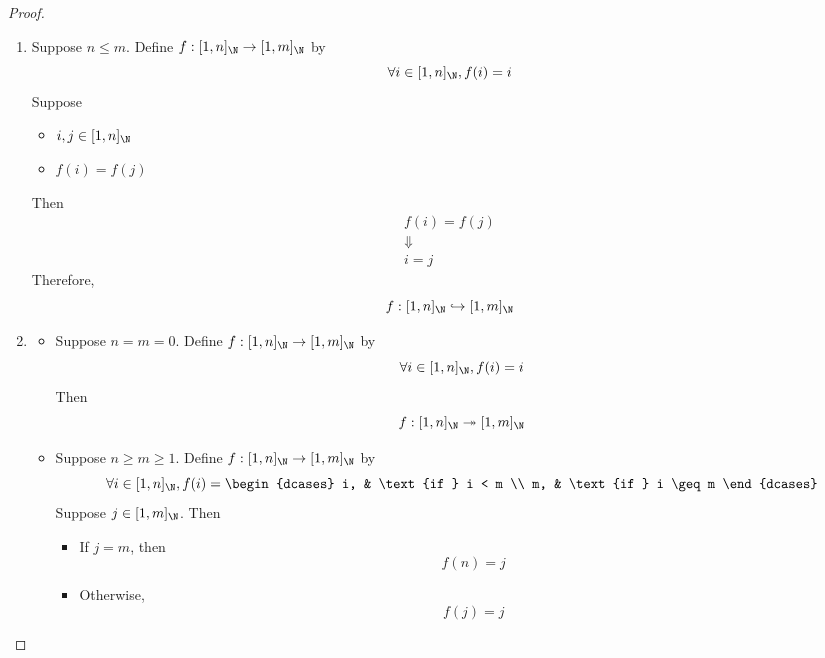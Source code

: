 \begin{proof}
  \leavevmode\par
  \begin{enumerate}[label=\textbf{(\Alph*)}]
    \item Suppose $n \leq m$. Define $f: [1, n]_{\N} \to [1, m]_{\N}$ by
          \[
            \forall i \in [1, n]_{\N}, f(i) = i
          \]
          Suppose
          \begin{itemize}
            \item $i, j \in [1, n]_{\N}$
            \item $f(i) = f(j)$
          \end{itemize}
          Then
          \[
            \begin{array}{c}
              f(i) = f(j) \\
              \Downarrow  \\
              i = j
            \end{array}
          \]
          Therefore,
          \[
            f: [1, n]_{\N} \hookrightarrow [1, m]_{\N}
          \]
    \item \begin{itemize}
            \item Suppose $n = m = 0$. Define $f: [1, n]_{\N} \to [1, m]_{\N}$ by
                  \[
                    \forall i \in [1, n]_{\N}, f(i) = i
                  \]
                  Then
                  \[
                    f: [1, n]_{\N} \twoheadrightarrow [1, m]_{\N}
                  \]
            \item Suppose $n \geq m \geq 1$. Define $f: [1, n]_{\N} \to [1, m]_{\N}$ by
                  \[
                    \forall i \in [1, n]_{\N}, f(i) = \begin{dcases}
                      i, & \text{if } i < m    \\
                      m, & \text{if } i \geq m
                    \end{dcases}
                  \]
                  Suppose $j \in [1, m]_{\N}$. Then
                  \begin{itemize}
                    \item If $j = m$, then
                          \[
                            f(n) = j
                          \]
                    \item Otherwise,
                          \[
                            f(j) = j
                          \]
                  \end{itemize}

\end{itemize}
\end{enumerate}
\end{proof}
